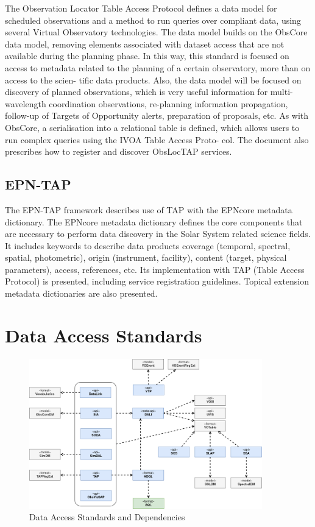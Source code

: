\documentclass[11pt,a4paper]{ivoa}
\begin{document}
The Observation Locator Table Access Protocol defines a data model for scheduled observations 
and a method to run queries over compliant data, using several Virtual Observatory technologies.
The data model builds on the ObsCore data model, removing elements associated with dataset 
access that are not available during the planning phase. In this way, this standard is focused 
on access to metadata related to the planning of a certain observatory, more than on access to 
the scien- tific data products. Also, the data model will be focused on discovery of planned 
observations, which is very useful information for multi-wavelength coordination observations, 
re-planning information propagation, follow-up of Targets of Opportunity alerts, preparation 
of proposals, etc. As with ObsCore, a serialisation into a relational table is defined, which 
allows users to run complex queries using the IVOA Table Access Proto- col. The document also 
prescribes how to register and discover ObsLocTAP services. 

\subsection{EPN-TAP}

The EPN-TAP framework describes use of TAP with the EPNcore metadata dictionary. The EPNcore 
metadata dictionary defines the core components that are necessary to perform data discovery 
in the Solar System related science fields. It includes keywords to describe data products 
coverage (temporal, spectral, spatial, photometric), origin (instrument, facility), content 
(target, physical parameters), access, references, etc. Its implementation with TAP (Table 
Access Protocol) is presented, including service registration guidelines. Topical extension 
metadata dictionaries are also presented. 

\section{Data Access Standards}

\begin{figure}[h]
\centering
\includegraphics[width=0.90\textwidth]{ivoa-arch-dal.png}
\caption{Data Access Standards and Dependencies}
\label{fig:daldeps}
\end{figure}
\end{document}
